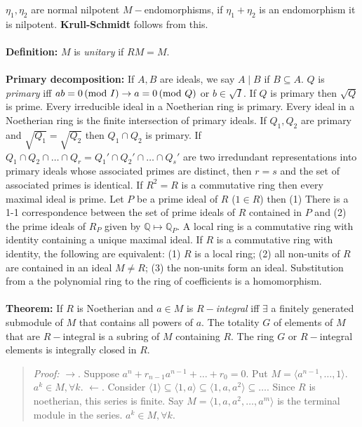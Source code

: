 $\eta_1, \eta_2$ are normal nilpotent $M-$endomorphisms, if $\eta_1 + \eta_2$
is an endomorphism it is nilpotent.  {\bf Krull-Schmidt} follows
from this.  
\\
\\
{\bf Definition:} $M$ is \emph{unitary} if $RM=M$.  
\\
\\
{\bf Primary decomposition:}
If $A,B$ are ideals, we say $A \mid B$ if $B \subseteq A$. $Q$ is \emph{primary} iff
$ab= 0 \thinspace \textnormal{(mod } I \textnormal{)} \rightarrow a = 0 \thinspace \textnormal{(mod } Q \textnormal{)}$ or $b \in {\sqrt I}$.  If
$Q$ is primary then ${\sqrt Q}$ is prime.  
Every irreducible ideal in a Noetherian ring is primary.
Every ideal in a Noetherian ring is the finite intersection of
primary ideals.  If $Q_1, Q_2$ are primary and
${\sqrt {Q_1}}= {\sqrt {Q_2}}$ then $Q_1 \cap Q_2$ is primary.
If $Q_1 \cap Q_2 \cap \ldots \cap Q_r = Q_1' \cap Q_2' \cap \ldots \cap Q_s'$
are two irredundant representations into primary ideals whose associated primes
are distinct, then $r=s$ and the set of associated primes is identical.
If $R^2=R$ is a commutative ring then every maximal ideal is prime.  Let
$P$ be a prime ideal of $R$ ($1 \in R$) then (1)
There is a 1-1 correspondence between the set of prime ideals of $R$ contained
in $P$ and (2) the prime ideals of $R_P$ given by 
${\mathbb Q} \mapsto {\mathbb Q}_P$.  A local ring is a commutative ring
with identity containing a unique maximal ideal.  If $R$ is a commutative ring
with identity, the following are equivalent: (1) $R$ is a local ring; (2)
all non-units of $R$ are contained in an ideal 
$M \ne R$; (3)  the non-units form an ideal.
Substitution from a the polynomial ring to the ring of coefficients is a homomorphism.
\\
\\
{\bf Theorem:} 
If $R$ is Noetherian and $a \in M$ is $R-$\emph{integral} iff $\exists$ a finitely
generated submodule of $M$ that contains all powers of $a$.  The totality
$G$ of elements of $M$ that are $R-$integral is a subring of $M$ containing
$R$.  The ring $G$ or $R-$integral elements is integrally closed in $R$.
\begin{quote}
\emph{Proof:} $\rightarrow$.  Suppose $a^n + r_{n-1} a^{n-1} + \ldots + r_0 = 0$.
Put $M= \langle a^{n-1}, \ldots, 1 \rangle$.  $a^k \in M, \forall k$.
$\leftarrow$. Consider 
$\langle 1 \rangle \subseteq \langle 1, a \rangle \subseteq
\langle 1, a, a^2 \rangle \subseteq \ldots$.  Since $R$ is noetherian, this series
is finite.  Say $M = \langle 1, a, a^2, \ldots, a^m \rangle$ is the terminal module
in the series.  $a^k \in M, \forall k$.
\end{quote}
